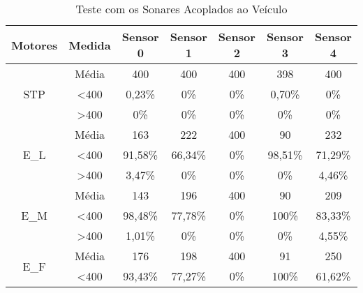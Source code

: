 \begin{table}[H]
\centering
\caption{Teste com os Sonares Acoplados ao Veículo}
\label{teste_4}
\begin{tabular}{|c|c|ccccc|}
\hline
\textbf{Motores}                & \textbf{Medida}  & \textbf{Sensor 0} & \textbf{Sensor 1} & \textbf{Sensor 2} & \textbf{Sensor 3} & \textbf{Sensor 4} \\ \hline
\multirow{3}{*}{STP}            & Média            & 400               & 400               & 400               & 398               & 400               \\
                                & \textless 400    & 0,23\%            & 0\%            & 0\%            & 0,70\%            & 0\%            \\
                                & \textgreater 400 & 0\%            & 0\%            & 0\%            & 0\%            & 0\%            \\ \hline
\multirow{3}{*}{E\_L}           & Média            & 163               & 222               & 400               & 90                & 232               \\
                                & \textless 400    & 91,58\%           & 66,34\%           & 0\%            & 98,51\%           & 71,29\%           \\
                                & \textgreater 400 & 3,47\%            & 0\%            & 0\%            & 0\%            & 4,46\%            \\ \hline
\multirow{3}{*}{E\_M}           & Média            & 143               & 196               & 400               & 90                & 209               \\
                                & \textless 400    & 98,48\%           & 77,78\%           & 0\%            & 100\%          & 83,33\%           \\
                                & \textgreater 400 & 1,01\%            & 0\%            & 0\%            & 0\%            & 4,55\%            \\ \hline
\multirow{3}{*}{E\_F}           & Média            & 176               & 198               & 400               & 91                & 250               \\
                                & \textless 400    & 93,43\%           & 77,27\%           & 0\%            & 100\%          & 61,62\%           \\

\end{tabular}
\end{table}
